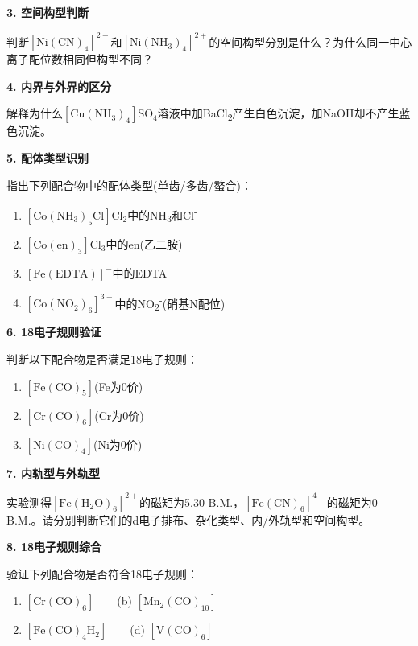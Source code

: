 \documentclass[a4paper,11pt]{ctexart}
\providecommand{\tightlist}{\setlength{\itemsep}{0pt}\setlength{\parskip}{0pt}}
\newcommand{\箭}{\ensuremath{\rightarrow}}
\newcommand{\左箭}{\ensuremath{\leftarrow}}
\newcommand{\上箭}{\ensuremath{\uparrow}}
\newcommand{\下箭}{\ensuremath{\downarrow}}
\newcommand{\衡}{\ensuremath{\rightleftharpoons}}
\newcommand{\双箭}{\ensuremath{\leftrightarrow}}
\newcommand{\约等于}{\ensuremath{\approx}}
\newcommand{\小于等于}{\ensuremath{\leq}}
\newcommand{\大于等于}{\ensuremath{\geq}}
\newcommand{\不等于}{\ensuremath{\neq}}
\newcommand{\西格马}{\ensuremath{\sigma}}
\newcommand{\派}{\ensuremath{\pi}}
\begin{document}
\textbf{3. 空间构型判断}

判断\(\mathrm{[Ni(CN)_4]^{2-}}\)和\(\mathrm{[Ni(NH_3)_4]^{2+}}\)的空间构型分别是什么？为什么同一中心离子配位数相同但构型不同？

\textbf{4. 内界与外界的区分}

解释为什么\(\mathrm{[Cu(NH_3)_4]SO_4}\)溶液中加BaCl\textsubscript{2}产生白色沉淀，加NaOH却不产生蓝色沉淀。

\textbf{5. 配体类型识别}

指出下列配合物中的配体类型(单齿/多齿/螯合)：

\begin{enumerate}
\def\labelenumi{(\alph{enumi})}
\tightlist
\item
  \(\mathrm{[Co(NH_3)_5Cl]Cl_2}\)中的NH\textsubscript{3}和Cl\textsuperscript{-}
\item
  \(\mathrm{[Co(en)_3]Cl_3}\)中的en(乙二胺)
\item
  \(\mathrm{[Fe(EDTA)]^-}\)中的EDTA
\item
  \(\mathrm{[Co(NO_2)_6]^{3-}}\)中的NO\textsubscript{2}\textsuperscript{-}(硝基N配位)
\end{enumerate}

\textbf{6. 18电子规则验证}

判断以下配合物是否满足18电子规则：

\begin{enumerate}
\def\labelenumi{(\alph{enumi})}
\tightlist
\item
  \(\mathrm{[Fe(CO)_5]}\)(Fe为0价)
\item
  \(\mathrm{[Cr(CO)_6]}\)(Cr为0价)
\item
  \(\mathrm{[Ni(CO)_4]}\)(Ni为0价)
\end{enumerate}

\textbf{7. 内轨型与外轨型}

实验测得\(\mathrm{[Fe(H_2O)_6]^{2+}}\)的磁矩为5.30 B.M.，\(\mathrm{[Fe(CN)_6]^{4-}}\)的磁矩为0 B.M.。请分别判断它们的d电子排布、杂化类型、内/外轨型和空间构型。

\textbf{8. 18电子规则综合}

验证下列配合物是否符合18电子规则：

\begin{enumerate}
\def\labelenumi{(\alph{enumi})}
\tightlist
\item
  \(\mathrm{[Cr(CO)_6]}\)　　(b) \(\mathrm{[Mn_2(CO)_{10}]}\)
\item
  \(\mathrm{[Fe(CO)_4H_2]}\)　　(d) \(\mathrm{[V(CO)_6]}\)
\end{enumerate}
\end{document}
